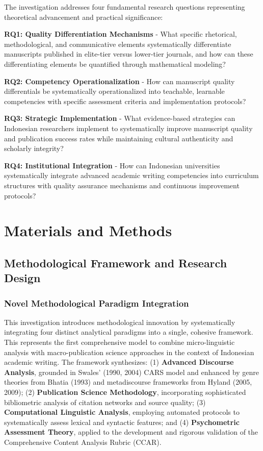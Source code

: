 \documentclass[journal,article,submit,pdftex,moreauthors]{Definitions/mdpi}
\begin{document}
The investigation addresses four fundamental research questions representing theoretical advancement and practical significance:

\textbf{RQ1: Quality Differentiation Mechanisms} - What specific rhetorical, methodological, and communicative elements systematically differentiate manuscripts published in elite-tier versus lower-tier journals, and how can these differentiating elements be quantified through mathematical modeling?

\textbf{RQ2: Competency Operationalization} - How can manuscript quality differentials be systematically operationalized into teachable, learnable competencies with specific assessment criteria and implementation protocols?

\textbf{RQ3: Strategic Implementation} - What evidence-based strategies can Indonesian researchers implement to systematically improve manuscript quality and publication success rates while maintaining cultural authenticity and scholarly integrity?

\textbf{RQ4: Institutional Integration} - How can Indonesian universities systematically integrate advanced academic writing competencies into curriculum structures with quality assurance mechanisms and continuous improvement protocols?

\section{Materials and Methods}

\subsection{Methodological Framework and Research Design}

\subsubsection{Novel Methodological Paradigm Integration}

This investigation introduces methodological innovation by systematically integrating four distinct analytical paradigms into a single, cohesive framework. This represents the first comprehensive model to combine micro-linguistic analysis with macro-publication science approaches in the context of Indonesian academic writing. The framework synthesizes: (1) \textbf{Advanced Discourse Analysis}, grounded in Swales' (1990, 2004) CARS model and enhanced by genre theories from Bhatia (1993) and metadiscourse frameworks from Hyland (2005, 2009); (2) \textbf{Publication Science Methodology}, incorporating sophisticated bibliometric analysis of citation networks and source quality; (3) \textbf{Computational Linguistic Analysis}, employing automated protocols to systematically assess lexical and syntactic features; and (4) \textbf{Psychometric Assessment Theory}, applied to the development and rigorous validation of the Comprehensive Content Analysis Rubric (CCAR).
\end{document}
